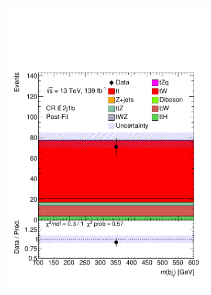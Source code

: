 \begin{figure}[!h]
\begin{subfigure}[b]{0.33\linewidth}
   \includegraphics[width=\textwidth]{ubonn-thesis/Chapters/Chapters_07/Figure/Data/CR_2j1b_postFit.pdf} 
    \caption{}
  \end{subfigure} 
  \centering
  \begin{subfigure}[b]{0.33\linewidth}

\end{subfigure}
\end{figure}
